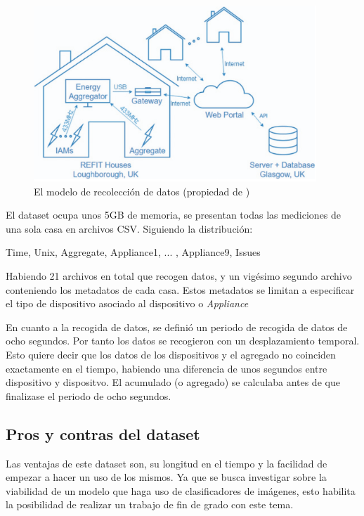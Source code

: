 \begin{figure}[H]
    \centering
    \includegraphics[height=250px]{images/REFITmodeloDatos.png}
    \caption{El modelo de recolección de datos (propiedad de \autocite{REFIT})}
    \label{diagramaBBDD}
\end{figure}

El dataset ocupa unos 5GB de memoria, se presentan todas las mediciones de una sola casa en archivos CSV. Siguiendo la distribución:
\begin{center}
    Time, Unix, Aggregate, Appliance1, ... , Appliance9, Issues
\end{center}
Habiendo 21 archivos en total que recogen datos, y un vigésimo segundo archivo conteniendo los metadatos de cada casa. Estos metadatos se limitan a especificar el tipo de dispositivo asociado al dispositivo o \textit{Appliance} 

En cuanto a la recogida de datos, se definió un periodo de recogida de datos de ocho segundos. Por tanto los datos se recogieron con un desplazamiento temporal. Esto quiere decir que los datos de los dispositivos y el agregado no coinciden exactamente en el tiempo, habiendo una diferencia de unos segundos entre dispositivo y dispositvo. El acumulado (o agregado) se calculaba antes de que finalizase el periodo de ocho segundos.


\subsection{Pros y contras del dataset}

Las ventajas de este dataset son, su longitud en el tiempo y la facilidad de empezar a hacer un uso de los mismos. Ya que se busca investigar sobre la viabilidad de un modelo que haga uso de clasificadores de imágenes, esto habilita la posibilidad de realizar un trabajo de fin de grado con este tema. 

